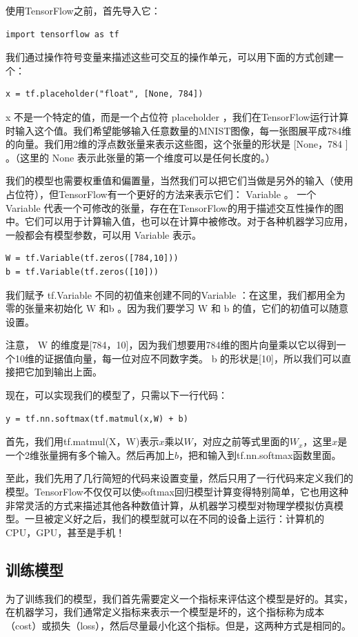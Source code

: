 使用TensorFlow之前，首先导入它：
\begin{lstlisting}
import tensorflow as tf
\end{lstlisting}
我们通过操作符号变量来描述这些可交互的操作单元，可以用下面的方式创建一个：
\begin{lstlisting}
x = tf.placeholder("float", [None, 784])
\end{lstlisting}
x 不是一个特定的值，而是一个占位符 placeholder ，我们在TensorFlow运行计算时输入这个值。我们希望能够输入任意数量的MNIST图像，每一张图展平成784维的向量。我们用2维的浮点数张量来表示这些图，这个张量的形状是 [None，784 ] 。（这里的 None 表示此张量的第一个维度可以是任何长度的。）

我们的模型也需要权重值和偏置量，当然我们可以把它们当做是另外的输入（使用占位符），但TensorFlow有一个更好的方法来表示它们： Variable 。 一个 Variable 代表一个可修改的张量，存在在TensorFlow的用于描述交互性操作的图中。它们可以用于计算输入值，也可以在计算中被修改。对于各种机器学习应用，一般都会有模型参数，可以用 Variable 表示。

\begin{lstlisting}
W = tf.Variable(tf.zeros([784,10]))
b = tf.Variable(tf.zeros([10]))
\end{lstlisting}

我们赋予 tf.Variable 不同的初值来创建不同的Variable ：在这里，我们都用全为零的张量来初始化 W 和b 。因为我们要学习 W 和 b 的值，它们的初值可以随意设置。

注意， W 的维度是[784，10]，因为我们想要用784维的图片向量乘以它以得到一个10维的证据值向量，每一位对应不同数字类。 b 的形状是[10]，所以我们可以直接把它加到输出上面。

现在，可以实现我们的模型了，只需以下一行代码：

\begin{lstlisting}
y = tf.nn.softmax(tf.matmul(x,W) + b)
\end{lstlisting}

首先，我们用tf.matmul(X，W)表示$x$乘以$W$，对应之前等式里面的$W_x$，这里$x$是一个2维张量拥有多个输入。然后再加上$b$，把和输入到tf.nn.softmax函数里面。

至此，我们先用了几行简短的代码来设置变量，然后只用了一行代码来定义我们的模型。TensorFlow不仅仅可以使softmax回归模型计算变得特别简单，它也用这种非常灵活的方式来描述其他各种数值计算，从机器学习模型对物理学模拟仿真模型。一旦被定义好之后，我们的模型就可以在不同的设备上运行：计算机的CPU，GPU，甚至是手机！

\subsection{训练模型}
为了训练我们的模型，我们首先需要定义一个指标来评估这个模型是好的。其实，在机器学习，我们通常定义指标来表示一个模型是坏的，这个指标称为成本（cost）或损失（loss），然后尽量最小化这个指标。但是，这两种方式是相同的。


